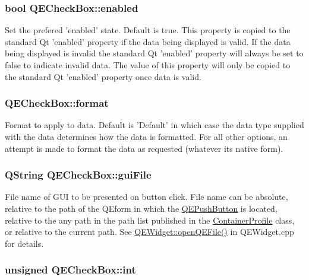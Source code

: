 \hypertarget{classQECheckBox_afff99504d598628e0b8f06c54282935b}{
\subsubsection[{enabled}]{\setlength{\rightskip}{0pt plus 5cm}bool QECheckBox::enabled}}
\label{classQECheckBox_afff99504d598628e0b8f06c54282935b}
Set the prefered 'enabled' state. Default is true. This property is copied to the standard Qt 'enabled' property if the data being displayed is valid. If the data being displayed is invalid the standard Qt 'enabled' property will always be set to false to indicate invalid data. The value of this property will only be copied to the standard Qt 'enabled' property once data is valid. \hypertarget{classQECheckBox_a3fc952f7bfae3bcf56eae3ea93e444e9}{
\subsubsection[{format}]{ QECheckBox::format}}
\label{classQECheckBox_a3fc952f7bfae3bcf56eae3ea93e444e9}
Format to apply to data. Default is 'Default' in which case the data type supplied with the data determines how the data is formatted. For all other options, an attempt is made to format the data as requested (whatever its native form). \hypertarget{classQECheckBox_af90f244040b18450768d30647ab79303}{
\subsubsection[{guiFile}]{\setlength{\rightskip}{0pt plus 5cm}QString QECheckBox::guiFile}}
\label{classQECheckBox_af90f244040b18450768d30647ab79303}
File name of GUI to be presented on button click. File name can be absolute, relative to the path of the QEform in which the \hyperlink{classQEPushButton}{QEPushButton} is located, relative to the any path in the path list published in the \hyperlink{classContainerProfile}{ContainerProfile} class, or relative to the current path. See \hyperlink{classQEWidget_a1249c1c022d5ec63e0fa82df20356039}{QEWidget::openQEFile()} in QEWidget.cpp for details. \hypertarget{classQECheckBox_a138cbbabbe82d3c60e9afd8e6f53d778}{
\subsubsection[{int}]{\setlength{\rightskip}{0pt plus 5cm}unsigned QECheckBox::int}}
